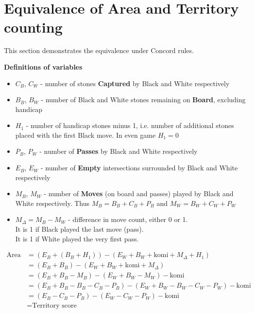 \documentclass[11pt]{article}
\begin{document}
\newpage
\section{Equivalence of Area and Territory counting}

This section demonstrates the equivalence under Concord rules.

\textbf{Definitions of variables}

\begin{itemize}
\item $C_B$, $C_W$ - number of stones \textbf{Captured} by Black and White respectively
\item $B_B$, $B_W$ - number of Black and White stones remaining on \textbf{Board}, excluding handicap
\item $H_1$ - number of handicap stones minus 1, i.e. number of additional stones placed with the first Black move. In even game $H_1 = 0$
\item $P_B$, $P_W$ - number of \textbf{Passes} by Black and White respectively
\item $E_B$, $E_W$ - number of \textbf{Empty} intersections surrounded by Black and White respectively
\item $M_B$, $M_W$ - number of \textbf{Moves} (on board and passes) played by Black and White respectively. Thus $M_B = B_B + C_B + P_B$ and $M_W = B_W + C_W + P_W$
\item $M_\Delta = M_B - M_W$ - difference in move count, either 0 or 1. \\
It is 1 if Black played the last move (pass).\\
It is 1 if White played the very first pass.
\end{itemize}

\begin{align}
\text{Area score} &= (E_B + (B_B+H_1)) - (E_W + B_W + \text{komi} + M_\Delta + H_1) \\
&= (E_B + B_B) - (E_W + B_W + \text{komi} + M_\Delta) \\
&= (E_B + B_B - M_B) - (E_W + B_W - M_W) - \text{komi} \\
&= (E_B + B_B - B_B - C_B - P_B ) - (E_W + B_W - B_W - C_W - P_W) - \text{komi} \\
&= (E_B - C_B - P_B) - (E_W - C_W - P_W) - \text{komi} \\
&= \text{Territory score}
\end{align}
\end{document}
